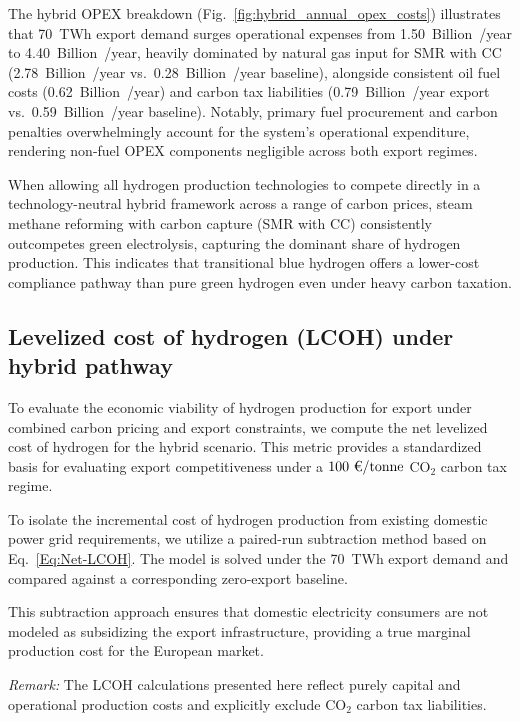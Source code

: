 \documentclass[preprint,12pt]{elsarticle}
\begin{document}
The hybrid OPEX breakdown (Fig.~\ref{fig:hybrid_annual_opex_costs}) illustrates that 70~TWh export demand surges operational expenses from 1.50~Billion~\texteuro/year to 4.40~Billion~\texteuro/year, heavily dominated by natural gas input for SMR with CC (2.78~Billion~\texteuro/year vs.~0.28~Billion~\texteuro/year baseline), alongside consistent oil fuel costs (0.62~Billion~\texteuro/year) and carbon tax liabilities (0.79~Billion~\texteuro/year export vs.~0.59~Billion~\texteuro/year baseline). Notably, primary fuel procurement and carbon penalties overwhelmingly account for the system's operational expenditure, rendering non-fuel OPEX components negligible across both export regimes.


When allowing all hydrogen production technologies to compete directly in a technology-neutral hybrid framework across a range of carbon prices, steam methane reforming with carbon capture (SMR with CC) consistently outcompetes green electrolysis, capturing the dominant share of hydrogen production. This indicates that transitional blue hydrogen offers a lower-cost compliance pathway than pure green hydrogen even under heavy carbon taxation.


\subsection{Levelized cost of hydrogen (LCOH) under hybrid pathway}
To evaluate the economic viability of hydrogen production for export under combined carbon pricing and export constraints, we compute the net levelized cost of hydrogen for the hybrid scenario. This metric provides a standardized basis for evaluating export competitiveness under a $100\text{~\texteuro/tonne}$ $\text{CO}_2$ carbon tax regime.

To isolate the incremental cost of hydrogen production from existing domestic power grid requirements, we utilize a paired-run subtraction method based on Eq.~\ref{Eq:Net-LCOH}. The model is solved under the 70~TWh export demand and compared against a corresponding zero-export baseline.

This subtraction approach ensures that domestic electricity consumers are not modeled as subsidizing the export infrastructure, providing a true marginal production cost for the European market.

\textit{Remark:} The LCOH calculations presented here reflect purely capital and operational production costs and explicitly exclude $\text{CO}_2$ carbon tax liabilities.
\end{document}
